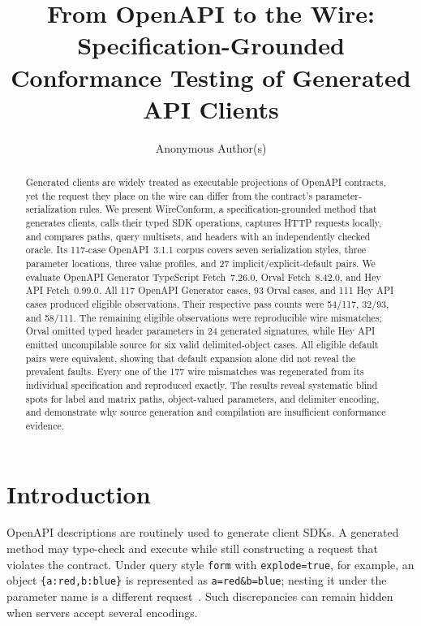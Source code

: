 \documentclass[runningheads]{llncs}
\begin{document}
\title{From OpenAPI to the Wire: Specification-Grounded Conformance Testing of Generated API Clients}
\author{Anonymous Author(s)}
\maketitle

\begin{abstract}
Generated clients are widely treated as executable projections of OpenAPI contracts, yet the request they place on the wire can differ from the contract's parameter-serialization rules. We present WireConform, a specification-grounded method that generates clients, calls their typed SDK operations, captures HTTP requests locally, and compares paths, query multisets, and headers with an independently checked oracle. Its 117-case OpenAPI~3.1.1 corpus covers seven serialization styles, three parameter locations, three value profiles, and 27 implicit/explicit-default pairs. We evaluate OpenAPI Generator TypeScript Fetch~7.26.0, Orval Fetch~8.42.0, and Hey API Fetch~0.99.0. All 117 OpenAPI Generator cases, 93 Orval cases, and 111 Hey API cases produced eligible observations. Their respective pass counts were 54/117, 32/93, and 58/111. The remaining eligible observations were reproducible wire mismatches; Orval omitted typed header parameters in 24 generated signatures, while Hey API emitted uncompilable source for six valid delimited-object cases. All eligible default pairs were equivalent, showing that default expansion alone did not reveal the prevalent faults. Every one of the 177 wire mismatches was regenerated from its individual specification and reproduced exactly. The results reveal systematic blind spots for label and matrix paths, object-valued parameters, and delimiter encoding, and demonstrate why source generation and compilation are insufficient conformance evidence.
\end{abstract}

\section{Introduction}

OpenAPI descriptions are routinely used to generate client SDKs. A generated method may type-check and execute while still constructing a request that violates the contract. Under query style \texttt{form} with \texttt{explode=true}, for example, an object \texttt{\{a:red,b:blue\}} is represented as \texttt{a=red\&b=blue}; nesting it under the parameter name is a different request~\cite{oas}. Such discrepancies can remain hidden when servers accept several encodings.
\end{document}
